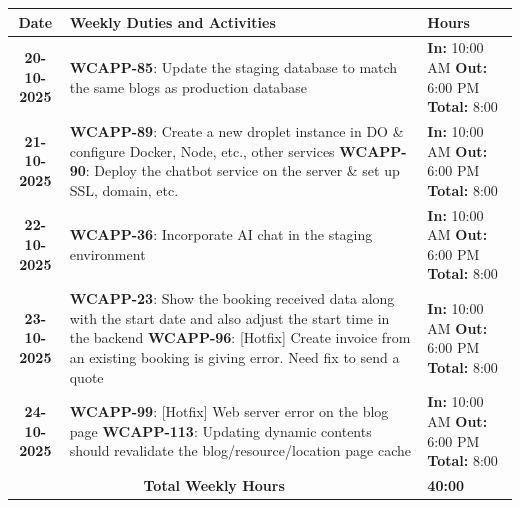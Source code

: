 \documentclass[a4paper,11pt]{article}
\begin{document}
\begin{tabularx}{\textwidth}{|c|>{\raggedright\arraybackslash}X|>{\centering\arraybackslash}m{3.5cm}|}
\hline
\rowcolor{gray!30}
\textbf{Date} & \textbf{Weekly Duties and Activities} & \textbf{Hours} \\
\hline
\textbf{20-10-2025} & \textbf{WCAPP-85}: Update the staging database to match the same blogs as production database & \textbf{In:} 10:00 AM \newline \textbf{Out:} 6:00 PM \newline \textbf{Total:} 8:00 \\
\hline
\textbf{21-10-2025} & \textbf{WCAPP-89}: Create a new droplet instance in DO \& configure Docker, Node, etc., other services \newline \textbf{WCAPP-90}: Deploy the chatbot service on the server \& set up SSL, domain, etc. & \textbf{In:} 10:00 AM \newline \textbf{Out:} 6:00 PM \newline \textbf{Total:} 8:00 \\
\hline
\textbf{22-10-2025} & \textbf{WCAPP-36}: Incorporate AI chat in the staging environment & \textbf{In:} 10:00 AM \newline \textbf{Out:} 6:00 PM \newline \textbf{Total:} 8:00 \\
\hline
\textbf{23-10-2025} & \textbf{WCAPP-23}: Show the booking received data along with the start date and also adjust the start time in the backend \newline \textbf{WCAPP-96}: [Hotfix] Create invoice from an existing booking is giving error. Need fix to send a quote & \textbf{In:} 10:00 AM \newline \textbf{Out:} 6:00 PM \newline \textbf{Total:} 8:00 \\
\hline
\textbf{24-10-2025} & \textbf{WCAPP-99}: [Hotfix] Web server error on the blog page \newline \textbf{WCAPP-113}: Updating dynamic contents should revalidate the blog/resource/location page cache & \textbf{In:} 10:00 AM \newline \textbf{Out:} 6:00 PM \newline \textbf{Total:} 8:00 \\
\hline
\multicolumn{2}{|c|}{\textbf{Total Weekly Hours}} & \textbf{40:00} \\
\hline
\end{tabularx}

\vspace{3em}
\end{document}

